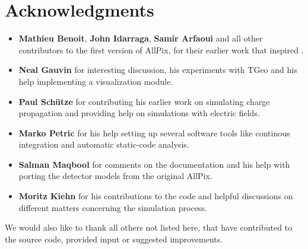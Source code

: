 \section{Acknowledgments}
\begin{itemize}
\item \textbf{Mathieu Benoit}, \textbf{John Idarraga}, \textbf{Samir Arfaoui} and all other contributors to the first version of AllPix, for their earlier work that inspired \apsq.
\item \textbf{Neal Gauvin} for interesting discussion, his experiments with TGeo and his help implementing a visualization module.
\item \textbf{Paul Sch\"utze} for contributing his earlier work on simulating charge propagation and providing help on simulations with electric fields.
\item \textbf{Marko Petric} for his help setting up several software tools like continous integration and automatic static-code analysis.
\item \textbf{Salman Maqbool} for comments on the documentation and his help with porting the detector models from the original AllPix.
\item \textbf{Moritz Kiehn} for his contributions to the code and helpful discussions on different matters concerning the simulation process.
\end{itemize}
We would also like to thank all others not listed here, that have contributed to the source code, provided input or suggested improvements. 
